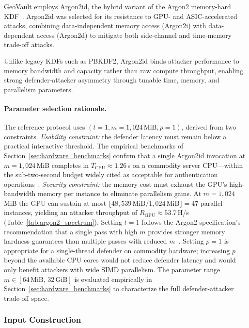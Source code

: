 \documentclass[journal,article,accept,pdftex,moreauthors]{Definitions/mdpi}
\begin{document}
GeoVault employs Argon2id, the hybrid variant of the Argon2 memory-hard KDF~\cite{7467361}. Argon2id was selected for its resistance to GPU- and ASIC-accelerated attacks, combining data-independent memory access (Argon2i) with data-dependent access (Argon2d) to mitigate both side-channel and time-memory trade-off attacks.

Unlike legacy KDFs such as PBKDF2, Argon2id binds attacker performance to memory bandwidth and capacity rather than raw compute throughput, enabling strong defender-attacker asymmetry through tunable time, memory, and parallelism parameters.

\paragraph{Parameter selection rationale.} The reference protocol uses $(t=1, m=1{,}024\,\text{MiB}, p=1)$, derived from two constraints. \emph{Usability constraint:} the defender latency must remain below a practical interactive threshold. The empirical benchmarks of Section~\ref{sec:hardware_benchmarks} confirm that a single Argon2id invocation at $m=1{,}024$\,MiB completes in $T_\text{CPU} \approx 1.26$\,s on a commodity server CPU---within the sub-two-second budget widely cited as acceptable for authentication operations~\cite{nielsen1994usability}. \emph{Security constraint:} the memory cost must exhaust the GPU's high-bandwidth memory per instance to eliminate parallelism gains. At $m=1{,}024$\,MiB the GPU can sustain at most $\lfloor 48{,}539\,\text{MiB} / 1{,}024\,\text{MiB} \rfloor = 47$ parallel instances, yielding an attacker throughput of $R_\text{GPU} \approx 53.7$\,H/s (Table~\ref{tab:argon2_spectrum}). Setting $t=1$ follows the Argon2 specification's recommendation that a single pass with high $m$ provides stronger memory hardness guarantees than multiple passes with reduced $m$~\cite{7467361}. Setting $p=1$ is appropriate for a single-thread defender on commodity hardware; increasing $p$ beyond the available CPU cores would not reduce defender latency and would only benefit attackers with wide SIMD parallelism. The parameter range $m \in [64\,\text{MiB},\, 32\,\text{GiB}]$ is evaluated empirically in Section~\ref{sec:hardware_benchmarks} to characterize the full defender-attacker trade-off space.

\subsubsection{Input Construction}
\end{document}
